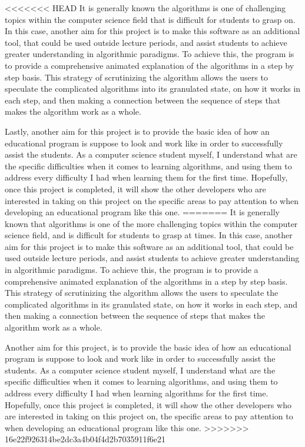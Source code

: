 <<<<<<< HEAD
It is generally known the algorithms is one of challenging topics within the computer science field that is difficult for students to grasp on. In this case, another aim for this project is to make this software as an additional tool, that could be used outside lecture periods, and assist students to achieve greater understanding in algorithmic paradigms. To achieve this, the program is to provide a comprehensive animated explanation of the algorithms in a step by step basis. This strategy of scrutinizing the algorithm allows the users to speculate the complicated algorithms into its granulated state, on how it works in each step, and then making a connection between the sequence of steps that makes the algorithm work as a whole.

Lastly, another aim for this project is to provide the basic idea of how an educational program is suppose to look and work like in order to successfully assist the students. As a computer science student myself, I understand what are the specific difficulties when it comes to learning algorithms, and using them to address every difficulty I had when learning them for the first time. Hopefully, once this project is completed, it will show the other developers who are interested in taking on this project on the specific areas to pay attention to when developing an educational program like this one. 
=======
It is generally known that algorithms is one of the more challenging topics within the computer science field, and is difficult for students to grasp at times. In this case, another aim for this project is to make this software as an additional tool, that could be used outside lecture periods, and assist students to achieve greater understanding in algorithmic paradigms. To achieve this, the program is to provide a comprehensive animated explanation of the algorithms in a step by step basis. 
This strategy of scrutinizing the algorithm allows the users to speculate the complicated algorithms in its granulated state, on how it works in each step, and then making a connection between the sequence of steps that makes the algorithm work as a whole.

Another aim for this project, is to provide the basic idea of how an educational program is suppose to look and work like in order to successfully assist the students. As a computer science student myself, I understand what are the specific difficulties when it comes to learning algorithms, and using them to address every difficulty I had when learning algorithms for the first time. Hopefully, once this project is completed, it will show the other developers who are interested in taking on this project on, the specific areas to pay attention to when developing an educational program like this one. 
>>>>>>> 16e22f926314be2dc3a4b04f4d2b7035911f6e21

